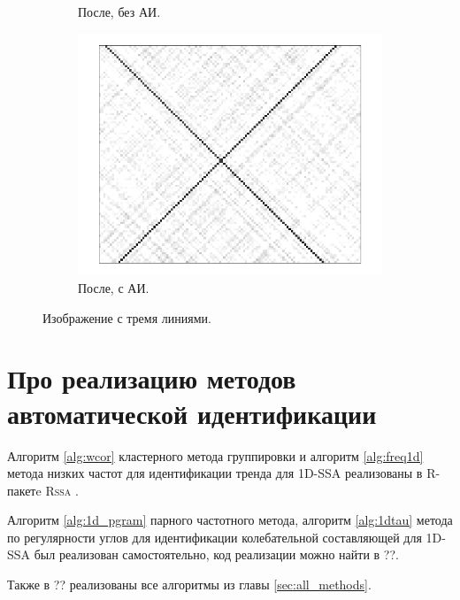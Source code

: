 \documentclass[specialist,
               substylefile = spbu.rtx,
               subf,href,colorlinks=true, 12pt]{disser}
\begin{document}
{{\begin{figure}[hhh!]
\begin{subfigure}[b]{0.32\textwidth}
        \caption{После, без АИ.}
        \label{fig:a_many_after}
    \end{subfigure}
     \begin{subfigure}[b]{0.32\textwidth}
       \includegraphics[width=\textwidth]{auto_lines}
        \caption{После, с АИ.}
        \label{fig:a_many_after2}
    \end{subfigure}
       \caption{Изображение с тремя линиями.}\label{fig:a_many}
\end{figure}   
 
\chapter{Про реализацию методов автоматической идентификации}
Алгоритм \ref{alg:wcor} кластерного метода группировки и алгоритм \ref{alg:freq1d} метода низких частот для идентификации тренда для 1D-SSA  реализованы в R-пакетe \textsc{Rssa} \cite{Rssa, Golyandina.Korobeynikov2013}.

Алгоритм \ref{alg:1d_pgram} парного частотного метода, алгоритм \ref{alg:1dtau} метода по регулярности углов для идентификации колебательной составляющей для 1D-SSA был реализован самостоятельно, код реализации можно найти в ??.

Также в ?? реализованы все алгоритмы из главы \ref{sec:all_methods}.

}}
\end{document}
